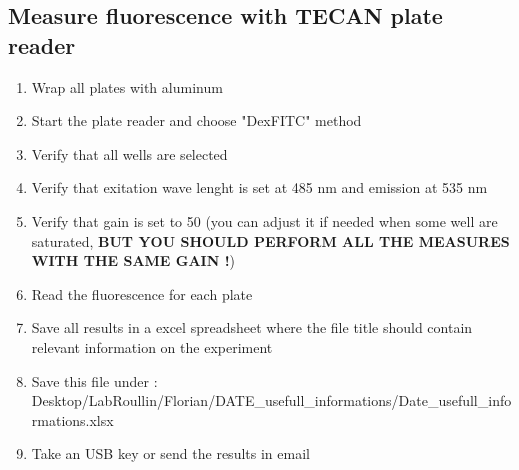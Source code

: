 \subsection{Measure fluorescence with TECAN plate reader}
\begin{enumerate}
\item Wrap all plates with aluminum
\item Start the plate reader and choose "DexFITC" method
\item Verify that all wells are selected 
\item Verify that exitation wave lenght is set at  485 nm and emission at 535 nm
\item Verify that gain is set to 50 (you can adjust it if needed when some well are saturated, \textbf{BUT YOU SHOULD PERFORM ALL THE MEASURES WITH THE SAME GAIN !})
\item Read the fluorescence for each plate
\item Save all results in a excel spreadsheet where the file title should contain relevant information on the experiment
\item Save this file under : \\ Desktop/LabRoullin/Florian/DATE\_usefull\_informations/Date\_usefull\_informations.xlsx
\item Take an USB key or send the results in email
\end{enumerate}
